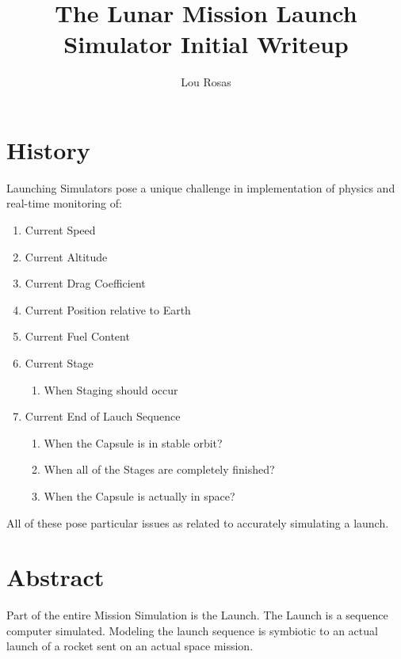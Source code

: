 \documentclass[letterpaper]{article}
\begin{document}
\title{The Lunar Mission Launch Simulator Initial Writeup}
\author{Lou Rosas}
\maketitle

\section{History}
Launching Simulators pose a unique challenge in implementation of
physics and real-time monitoring of:
\begin{enumerate}
\item Current Speed
\item Current Altitude
\item Current Drag Coefficient
\item Current Position relative to Earth
\item Current Fuel Content
\item Current Stage
\begin{enumerate}
\item When Staging should occur
\end{enumerate}
\item Current End of Lauch Sequence
\begin{enumerate}
\item When the Capsule is in stable orbit?
\item When all of the Stages are completely finished?
\item When the Capsule is actually in space?
\end{enumerate}
\end{enumerate}
All of these pose particular issues as related to accurately
simulating a launch.

\section{Abstract}
Part of the entire Mission Simulation is the Launch.  The Launch is a
sequence computer simulated.  Modeling the launch sequence is
symbiotic to an actual launch of a rocket sent on an actual space
mission.
\end{document}
